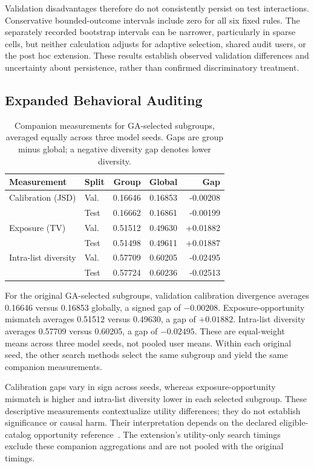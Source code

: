 \documentclass[sigconf,nonacm]{acmart}
\begin{document}
Validation disadvantages therefore do not consistently persist on test interactions. Conservative bounded-outcome intervals include zero for all six fixed rules. The separately recorded bootstrap intervals can be narrower, particularly in sparse cells, but neither calculation adjusts for adaptive selection, shared audit users, or the post hoc extension. These results establish observed validation differences and uncertainty about persistence, rather than confirmed discriminatory treatment.

\subsection{Expanded Behavioral Auditing}
\begin{table}[t]
\centering
\caption{Companion measurements for GA-selected subgroups, averaged equally across three model seeds. Gaps are group minus global; a negative diversity gap denotes lower diversity.}
\label{tab:audit}
\small
\begin{tabular}{llrrr}
\toprule
Measurement & Split & Group & Global & Gap \\
\midrule
Calibration (JSD) & Val. & 0.16646 & 0.16853 & -0.00208 \\
 & Test & 0.16662 & 0.16861 & -0.00199 \\
Exposure (TV) & Val. & 0.51512 & 0.49630 & +0.01882 \\
 & Test & 0.51498 & 0.49611 & +0.01887 \\
Intra-list diversity & Val. & 0.57709 & 0.60205 & -0.02495 \\
 & Test & 0.57724 & 0.60236 & -0.02513 \\
\bottomrule
\end{tabular}
\end{table}

For the original GA-selected subgroups, validation calibration divergence averages 0.16646 versus 0.16853 globally, a signed gap of $-0.00208$. Exposure-opportunity mismatch averages 0.51512 versus 0.49630, a gap of $+0.01882$. Intra-list diversity averages 0.57709 versus 0.60205, a gap of $-0.02495$. These are equal-weight means across three model seeds, not pooled user means. Within each original seed, the other search methods select the same subgroup and yield the same companion measurements.

Calibration gaps vary in sign across seeds, whereas exposure-opportunity mismatch is higher and intra-list diversity lower in each selected subgroup. These descriptive measurements contextualize utility differences; they do not establish significance or causal harm. Their interpretation depends on the declared eligible-catalog opportunity reference~\cite{burke2017multisided,biega2018equity,singh2018fairness}. The extension's utility-only search timings exclude these companion aggregations and are not pooled with the original timings.
\end{document}
